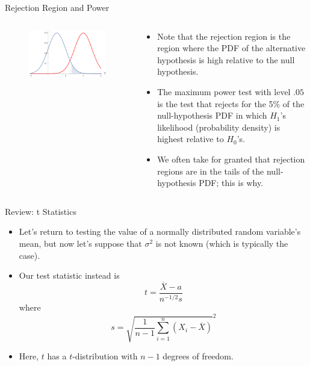 \begin{frame}{Rejection Region and Power}
\begin{columns}
\begin{column}{0.5\textwidth}
\begin{figure}	
	\includegraphics[width=\textwidth]{hypothesis_test.pdf}	
\end{figure}
\end{column}
\begin{column}{0.5\textwidth}
\begin{itemize}
	\item Note that the rejection region is the region where the PDF of
	the alternative hypothesis is high relative to the null hypothesis.
	
	\item The maximum power test with  level $.05$ is the test that rejects for the 5\%
	of the null-hypothesis PDF in which $H_1$'s likelihood (probability density) is highest
	relative to $H_0$'s.

	\item We often take for granted that rejection regions
	are in the tails of the null-hypothesis PDF; this is why.
\end{itemize}

\end{column}

\end{columns}
\end{frame}


\begin{frame}{Review: t Statistics}
\begin{itemize}
	\item Let's return to testing the value of a normally distributed random
	variable's mean, but now let's suppose that $\sigma^2$ is not known (which is
	typically the case).

	\smallskip
	\item Our test statistic instead is\[
		t = \frac{ \overline{X} - a}{n^{-1/2} s}
	\]
	where \[
s=\sqrt{\frac{1}{n-1}\sum_{i=1}^{n}\left(X_{i}-\overline{X}\right)}^2
\]

	\item Here, $t$ has a $t$-distribution with $n-1$ degrees of freedom. 

\end{itemize}
\end{frame}




